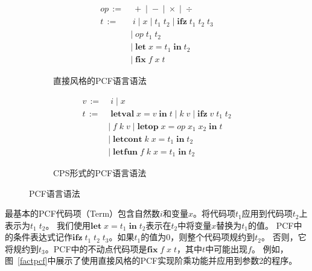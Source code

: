\begin{figure}[htbp]
        \centering
        \begin{subfigure}[b]{0.4\textwidth}
            \flushright
        \begin{equation}
            \nonumber
            \begin{aligned}
                op\, := &\; +\; |\; -\; | \; \times \; |\; \div \\
                t\, := &\; i\; |\; x\; |\; t_1\; t_2\; |\; \mathbf{ifz}\; t_1\; t_2\; t_3 \\
                & |\; op\; t_1\; t_2 \\
                & |\; \mathbf{let}\; x=t_1\; \mathbf{in}\; t_2 \\
                & |\; \mathbf{fix}\; f\; x\; t
            \end{aligned}
        \end{equation}
        \caption{直接风格的PCF语言语法}\label{directpcf}
        \end{subfigure}
        \begin{subfigure}[b]{0.5\textwidth}
            \flushleft
        \begin{equation}
            \nonumber
            \begin{aligned}
                v\, := &\; i\; |\; x \\
                t\, := &\; \mathbf{letval}\; x=v\; \mathbf{in}\; t\; |\; k\; v\; |\; \mathbf{ifz}\; v\; t_1\; t_2 \\
                & |\; f\; k\; v\; |\; \mathbf{letop}\; x=op\; x_1\; x_2\; \mathbf{in}\; t \\
                & |\; \mathbf{letcont}\; k\; x=t_1\; \mathbf{in}\; t_2 \\
                & |\; \mathbf{letfun}\; f\; k\; x=t_1\; \mathbf{in}\; t_2 
            \end{aligned}
        \end{equation}
        \caption{CPS形式的PCF语言语法}\label{cpspcf}
    \end{subfigure}
    \caption{PCF语言语法}\label{pcfsyntax}
    \end{figure}

最基本的PCF代码项（Term）包含自然数$i$和变量$x$。将代码项$t_1$应用到代码项$t_2$上表示为$t_1\; t_2$。
我们使用$\mathbf{let}\; x = t_1\; \mathbf{in}\; t_2$表示在$t_2$中将变量$x$替换为$t_1$的值。
PCF中的条件表达式记作$\mathbf{ifz}\; t_1\; t_2\; t_3$。如果$t_1$的值为0，则整个代码项规约到$t_2$。
否则，它将规约到$t_3$。PCF中的不动点代码项是$\mathbf{fix}\; f\; x\; t$，其中$t$中可能出现$f$。
例如，图~\ref{factpcf}中展示了使用直接风格的PCF实现阶乘功能并应用到参数2的程序。

